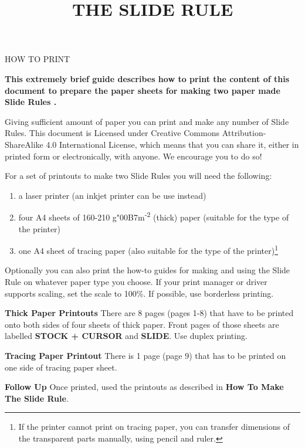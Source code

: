 
\newcommand{\makefulltitle}{How To Print The Slide Rule }



\title{\fontsize{60}{60}\selectfont THE SLIDE RULE}
\preauthor{}\postauthor{}\author{}
\predate{}\postdate{}\date{}


  \begin{center}
    \headingfont\fontsize{20}{20}\selectfont HOW TO PRINT
  \end{center}

  {\let\newpage\relax\maketitle}%
  \nosection{}
  \large\textbf{\makeperex This extremely brief guide describes how to print the content of this document to prepare the paper sheets for making two paper made Slide Rules \modelname.}

  \begin{multicols*}{3}
  \normalsize{

  Giving sufficient amount of paper you can print and make any number of Slide Rules. This document is Licensed under Creative Commons Attribution-ShareAlike 4.0 International License, which means that you can share it, either in printed form or electronically, with anyone. We encourage you to do so!

  For a set of printouts to make two Slide Rules you will need the following:
    \begin{enumerate}
      \setlength{\parskip}{0pt}
      \setlength{\parsep}{0pt}
      \item a laser printer (an inkjet printer can be use instead)
      \item four A4 sheets of 160-210 g{\char"00B7}m\textsuperscript{-2} (thick) paper (suitable for the type of the printer)
      \item one A4 sheet of tracing paper (also suitable for the type of the printer)\footnote{If the printer cannot print on tracing paper, you can transfer dimensions of the transparent parts manually, using pencil and ruler.}
    \end{enumerate}

  Optionally you can also print the how-to guides for making and using the Slide Rule on whatever paper type you choose. If your print manager or driver supports scaling, set the scale to 100\%. If possible, use borderless printing.

  \textbf{Thick Paper Printouts}
There are 8 pages (pages 1-8) that have to be printed onto both sides of four sheets of thick paper. Front pages of those sheets are labelled \textbf{STOCK + CURSOR} and \textbf{SLIDE}. Use duplex printing.

  \textbf{Tracing Paper Printout}
There is 1 page (page 9) that has to be printed on one side of tracing paper sheet. 

  \textbf{Follow Up}
Once printed, used the printouts as described in \textbf{How To Make The Slide Rule}.

  }
  \end{multicols*}
  

